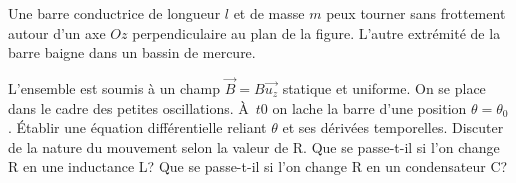 \begin{Exercise}[title=Pendule]
  Une barre conductrice de longueur $l$ et de masse $m$ peux tourner sans frottement autour d'un axe $Oz$ perpendiculaire au plan de la figure.
  L'autre extrémité de la barre baigne dans un bassin de mercure.

  L'ensemble est soumis à un champ $\vec{B} = B\vec{u_{z}}$ statique et uniforme. On se place dans le cadre des petites oscillations. À $t0$ on lache la barre d'une position $\theta=\theta_{0}$.
  \Question Établir une équation différentielle reliant $\theta$ et ses dérivées temporelles.
  \Question Discuter de la nature du mouvement selon la valeur de R.
  \Question Que se passe-t-il si l'on change R en une inductance L?
  \Question Que se passe-t-il si l'on change R en un condensateur C?
  \begin{center}
  \end{center}
\end{Exercise}
